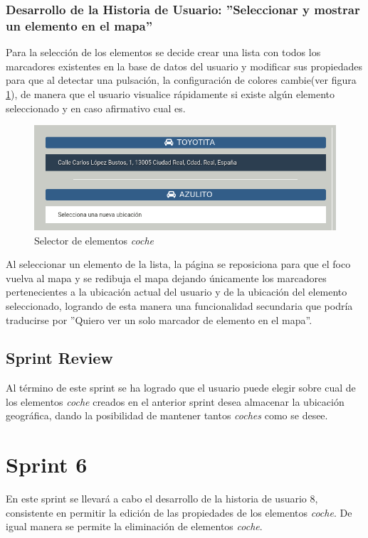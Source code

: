 	\subsubsection{Desarrollo de la Historia de Usuario: ''Seleccionar y mostrar un elemento en el mapa''}
	Para la selección de los elementos se decide crear una lista con todos los marcadores existentes en la base de datos del usuario y modificar sus propiedades para que al detectar una pulsación, la configuración de colores cambie(ver figura \ref{fig:seleccionar_coche}), de manera que el usuario visualice rápidamente si existe algún elemento seleccionado y en caso afirmativo cual es. \\
	
	\begin{figure}[H]
		\centering
		\includegraphics[width=15cm, fbox={\fboxrule} 4mm]{images/05-resultados/19-seleccionar_coche.png}
		\caption{Selector de elementos \textit{coche}}
		\label{fig:seleccionar_coche}
	\end{figure}	
		
	Al seleccionar un elemento de la lista, la página se reposiciona para que el foco vuelva al mapa y se redibuja el mapa dejando únicamente los marcadores pertenecientes a la ubicación actual del usuario y de la ubicación del elemento seleccionado, logrando de esta manera una funcionalidad secundaria que podría traducirse por ''Quiero ver un solo marcador de elemento en el mapa''.\\
			
	\subsection{Sprint Review}
	Al término de este sprint se ha logrado que el usuario puede elegir sobre cual de los elementos \textit{coche} creados en el anterior sprint desea almacenar la ubicación geográfica, dando la posibilidad de mantener tantos \textit{coches} como se desee.

\section{Sprint 6}
	En este sprint se llevará a cabo el desarrollo de la historia de usuario 8, consistente en permitir la edición de las propiedades de los elementos \textit{coche}. De igual manera se permite la eliminación de elementos \textit{coche}.
